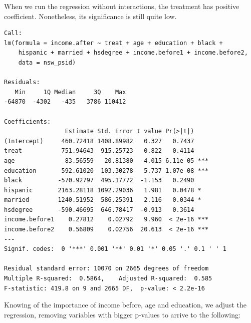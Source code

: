 \documentclass{article}
\begin{document}
When we run the regression without interactions, the treatment has positive coefficient. Nonetheless, its significance is still quite low.

\begin{lstlisting}[style=Rstyle, caption=Model without Interactions]
Call:
lm(formula = income.after ~ treat + age + education + black + 
    hispanic + married + hsdegree + income.before1 + income.before2, 
    data = nsw_psid)

Residuals:
   Min     1Q Median     3Q    Max 
-64870  -4302   -435   3786 110412 

Coefficients:
                 Estimate Std. Error t value Pr(>|t|)    
(Intercept)     460.72418 1408.89982   0.327   0.7437    
treat           751.94643  915.25723   0.822   0.4114    
age             -83.56559   20.81380  -4.015 6.11e-05 ***
education       592.61020  103.30278   5.737 1.07e-08 ***
black          -570.92797  495.17772  -1.153   0.2490    
hispanic       2163.28118 1092.29036   1.981   0.0478 *  
married        1240.51952  586.25391   2.116   0.0344 *  
hsdegree       -590.46695  646.78417  -0.913   0.3614    
income.before1    0.27812    0.02792   9.960  < 2e-16 ***
income.before2    0.56809    0.02756  20.613  < 2e-16 ***
---
Signif. codes:  0 '***' 0.001 '**' 0.01 '*' 0.05 '.' 0.1 ' ' 1

Residual standard error: 10070 on 2665 degrees of freedom
Multiple R-squared:  0.5864,	Adjusted R-squared:  0.585 
F-statistic: 419.8 on 9 and 2665 DF,  p-value: < 2.2e-16
\end{lstlisting}

Knowing of the importance of income before, age and education, we adjust the regression, removing variables with bigger p-values to arrive to the following:
\end{document}
